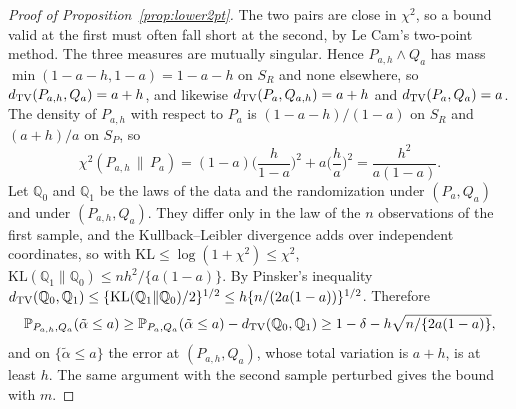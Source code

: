 \begin{proof}[Proof of Proposition~\ref{prop:lower2pt}]
The two pairs are close in $\chi^2$, so a bound valid at the first must often fall short at the second, by Le Cam's
two-point method. The three measures are mutually singular. Hence $P_{a,h}\wedge Q_a$ has mass $\min(1-a-h,1-a)=1-a-h$ on $S_R$ and
none elsewhere, so $d_{\mathrm{TV}}(P_{a,h},Q_a)=a+h$, and likewise $d_{\mathrm{TV}}(P_a,Q_{a,h})=a+h$ and $d_{\mathrm{TV}}(P_a,Q_a)=a$. The density of
$P_{a,h}$ with respect to $P_a$ is $(1-a-h)/(1-a)$ on $S_R$ and $(a+h)/a$ on $S_P$, so
\[
\chi^2(P_{a,h}\,\|\,P_a)=(1-a)\Big(\frac h{1-a}\Big)^2+a\Big(\frac ha\Big)^2=\frac{h^2}{a(1-a)} .
\]
Let $\mathbb Q_0$ and $\mathbb Q_1$ be the laws of the data and the randomization under $(P_a,Q_a)$ and under
$(P_{a,h},Q_a)$. They differ only in the law of the $n$ observations of the first sample, and the Kullback--Leibler
divergence adds over independent coordinates, so with $\mathrm{KL}\le\log(1+\chi^2)\le\chi^2$,
$\mathrm{KL}(\mathbb Q_1\|\mathbb Q_0)\le nh^2/\{a(1-a)\}$. By Pinsker's inequality
$d_{\mathrm{TV}}(\mathbb Q_0,\mathbb Q_1)\le\{\mathrm{KL}(\mathbb Q_1\|\mathbb Q_0)/2\}^{1/2}\le h\{n/(2a(1-a))\}^{1/2}$. Therefore
\[
\mathbb{P}_{P_{a,h},Q_a}(\tilde\alpha\le a)\ge\mathbb{P}_{P_a,Q_a}(\tilde\alpha\le a)-d_{\mathrm{TV}}(\mathbb Q_0,\mathbb Q_1)
\ge1-\delta-h\sqrt{n/\{2a(1-a)\}},
\]
and on $\{\tilde\alpha\le a\}$ the error at $(P_{a,h},Q_a)$, whose total variation is $a+h$, is at least $h$. The same
argument with the second sample perturbed gives the bound with $m$.
\end{proof}

